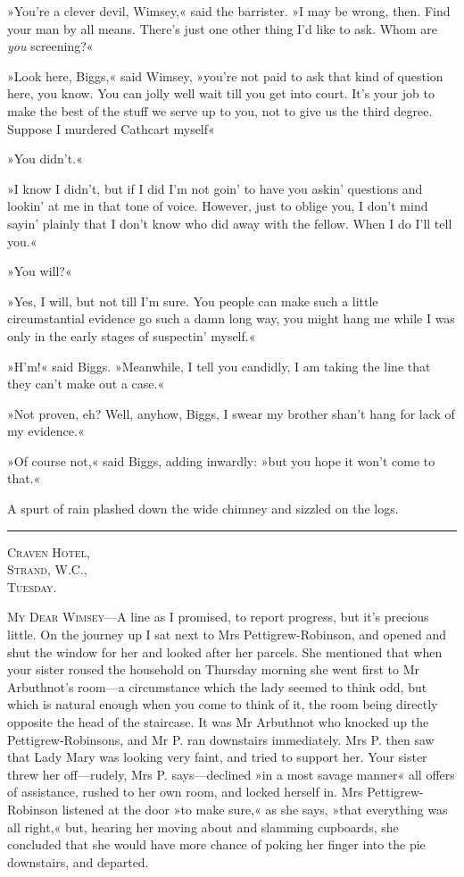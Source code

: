 »You're a clever devil, Wimsey,« said the barrister. »I may be wrong, then. Find your man by all means. There's just one other thing I'd like to ask. Whom are \textit{you} screening?«

»Look here, Biggs,« said Wimsey, »you're not paid to ask that kind of question here, you know. You can jolly well wait till you get into court. It's your job to make the best of the stuff we serve up to you, not to give us the third degree. Suppose I murdered Cathcart myself\longdash«

»You didn't.«

»I know I didn't, but if I did I'm not goin' to have you askin' questions and lookin' at me in that tone of voice. However, just to oblige you, I don't mind sayin' plainly that I don't know who did away with the fellow. When I do I'll tell you.«

»You will?«

»Yes, I will, but not till I'm sure. You people can make such a little circumstantial evidence go such a damn long way, you might hang me while I was only in the early stages of suspectin' myself.«

»H'm!« said Biggs. »Meanwhile, I tell you candidly, I am taking the line that they can't make out a case.«

»Not proven, eh? Well, anyhow, Biggs, I swear my brother shan't hang for lack of my evidence.«

»Of course not,« said Biggs, adding inwardly: »but you hope it won't come to that.«

A spurt of rain plashed down the wide chimney and sizzled on the logs.

\noindent\hfil\rule{0.5\textwidth}{.4pt}\hfil

\begin{flushright}
\textsc{Craven Hotel,}\\
\textsc{Strand, W.C.,}\\
\textsc{Tuesday.}
\end{flushright}


\textsc{My Dear Wimsey}---A line as I promised, to report progress, but it's precious little. On the journey up I sat next to Mrs  Pettigrew-Robinson, and opened and shut the window for her and looked after her parcels. She mentioned that when your sister roused the household on Thursday morning she went first to Mr Arbuthnot's room\allowbreak---\allowbreak a circumstance which the lady seemed to think odd, but which is natural enough when you come to think of it, the room being directly opposite the head of the staircase. It was Mr Arbuthnot who knocked up the Pettigrew-Robinsons, and Mr P. ran downstairs immediately.  Mrs P. then saw that Lady Mary was looking very faint, and tried to support her. Your sister threw her off\allowbreak---\allowbreak rudely, Mrs P. says\allowbreak---\allowbreak declined »in a most savage manner« all offers of assistance, rushed to her own room, and locked herself in. Mrs Pettigrew-Robinson listened at the door »to make sure,« as she says, »that everything was all right,« but, hearing her moving about and slamming cupboards, she concluded that she would have more chance of poking her finger into the pie downstairs, and departed.

